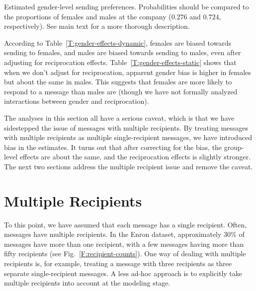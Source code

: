 \documentclass[aoas,preprint]{imsart}
\begin{document}
\begin{table}[h]
    \label{T:gender-effects}    
    \subtable[No Adjustment]{
        
        \label{T:gender-effects-static}
    }
    \caption{
        Estimated gender-level sending preferences.  Probabilities
        should be compared to the proportions of females and males
        at the company ($0.276$ and $0.724$, respectively).  See
        main text for a more thorough description.
    }
\end{table}

According to Table~\ref{T:gender-effects-dynamic}, females are biased
towards sending to females, and males are biased towards sending to
males, even after adjusting for reciprocation effects.
Table~\ref{T:gender-effects-static} shows that when we don't
adjust for reciprocation, apparent gender bias is higher in females
but about the same in males.  This suggests that females are more likely
to respond to a message than males are (though we have not formally
analyzed interactions between gender and reciprocation).

The analyses in this section all have a serious caveat, which is that
we have sidestepped the issue of messages with multiple recipients.  By
treating messages with multiple recipients as multiple single-recipient
messages, we have introduced bias in the estimates.  It turns out that
after correcting for the bias, the group-level effects are about the
same, and the reciprocation effects is slightly stronger.  The next two
sections address the multiple recipient issue and remove the caveat.


\section{Multiple Recipients}

To this point, we have assumed that each message has a single recipient.
Often, messages have multiple recipients.  In the Enron dataset,
approximately 30\% of messages have more than one recipient, with
a few messages having more than fifty recipients
(see Fig.~\ref{F:recipient-counts}).  One way of dealing with multiple
recipients is, for example, treating a message with three recipients as three
separate single-recipient messages.  A less ad-hoc approach is to explicitly
take multiple recipients into account at the modeling stage.
\end{document}
